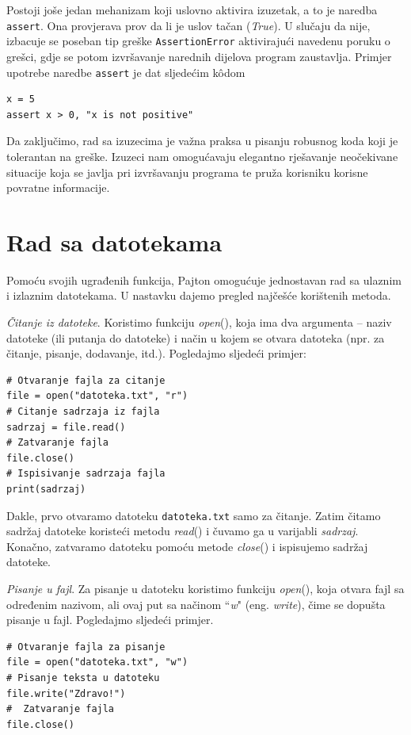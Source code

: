Postoji joše jedan mehanizam koji uslovno aktivira izuzetak, a to je naredba \texttt{assert}. Ona provjerava prov da li je uslov tačan (\emph{True}). U slučaju da nije, izbacuje se poseban tip greške \texttt{AssertionError} aktivirajući navedenu poruku o grešci, gdje se potom izvršavanje narednih dijelova program zaustavlja. Primjer upotrebe naredbe \texttt{assert} je dat sljedećim k\^odom

\begin{verbatim}
x = 5
assert x > 0, "x is not positive"
\end{verbatim}

Da zaključimo, rad sa izuzecima je važna praksa u pisanju robusnog koda koji je tolerantan na greške. Izuzeci nam omogućavaju elegantno rješavanje neočekivane situacije koja se javlja pri izvršavanju programa te pruža  korisniku korisne povratne informacije. 

\section{Rad sa datotekama}

Pomoću svojih ugrađenih funkcija, Pajton omogućuje jednostavan rad sa ulaznim i izlaznim datotekama. U nastavku dajemo pregled najčešće korištenih metoda.

\textit{Čitanje iz datoteke}. Koristimo funkciju \textit{open}(), koja ima dva argumenta -- naziv datoteke (ili putanja do datoteke) i način u kojem se otvara datoteka (npr. za čitanje, pisanje, dodavanje, itd.). Pogledajmo sljedeći primjer: 
\begin{verbatim}
# Otvaranje fajla za citanje
file = open("datoteka.txt", "r")
# Citanje sadrzaja iz fajla 
sadrzaj = file.read()
# Zatvaranje fajla
file.close()
# Ispisivanje sadrzaja fajla 
print(sadrzaj)
\end{verbatim}

Dakle, prvo otvaramo datoteku  \texttt{datoteka.txt} samo za čitanje. Zatim čitamo sadržaj datoteke koristeći metodu \textit{read}() i čuvamo ga u varijabli \textit{sadrzaj}. Konačno, zatvaramo datoteku pomoću metode \textit{close}() i ispisujemo sadržaj datoteke. 



\textit{Pisanje u fajl}. Za pisanje u datoteku koristimo funkciju \textit{open}(), koja otvara fajl sa određenim nazivom, ali ovaj put sa načinom ``\textit{w}" (eng. \textit{write}), čime se dopušta pisanje u fajl. Pogledajmo sljedeći primjer.
\begin{verbatim}
# Otvaranje fajla za pisanje
file = open("datoteka.txt", "w")
# Pisanje teksta u datoteku
file.write("Zdravo!")
#  Zatvaranje fajla 
file.close()
\end{verbatim}


